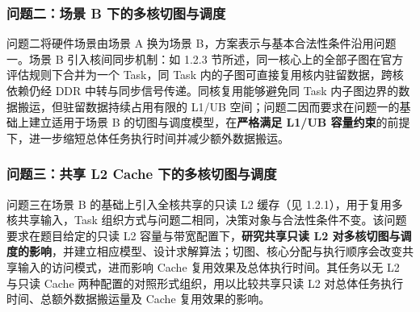 \subsubsection{问题二：场景 B 下的多核切图与调度}
问题二将硬件场景由场景 A 换为场景 B，方案表示与基本合法性条件沿用问题一。场景 B 引入核间同步机制：如 1.2.3 节所述，同一核心上的全部子图在官方评估规则下合并为一个 Task，同 Task 内的子图可直接复用核内驻留数据，跨核依赖仍经 DDR 中转与同步信号传递。同核复用能够避免同 Task 内子图边界的数据搬运，但驻留数据持续占用有限的 L1/UB 空间；问题二因而要求在问题一的基础上建立适用于场景 B 的切图与调度模型，在\textbf{严格满足 L1/UB 容量约束}的前提下，进一步缩短总体任务执行时间并减少额外数据搬运。

\subsubsection{问题三：共享 L2 Cache 下的多核切图与调度}
问题三在场景 B 的基础上引入全核共享的只读 L2 缓存（见 1.2.1），用于复用多核共享输入，Task 组织方式与问题二相同，决策对象与合法性条件不变。该问题要求在题目给定的只读 L2 容量与带宽配置下，\textbf{研究共享只读 L2 对多核切图与调度的影响}，并建立相应模型、设计求解算法；切图、核心分配与执行顺序会改变共享输入的访问模式，进而影响 Cache 复用效果及总体执行时间。其任务以无 L2 与只读 Cache 两种配置的对照形式组织，用以比较共享只读 L2 对总体任务执行时间、总额外数据搬运量及 Cache 复用效果的影响。

